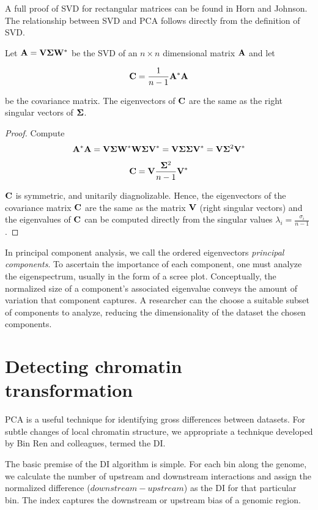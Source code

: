 A full proof of \gls{SVD} for rectangular matrices can be found in Horn and Johnson\cite{horn2013}. The relationship between
\gls{SVD} and \gls{PCA} follows directly from the definition of \gls{SVD}.

\begin{thm}
  Let $\mathbf{A} = \mathbf{V}\mathbf{\Sigma}\mathbf{W}^*$ be the \gls{SVD} of an $n \times n$ dimensional matrix $\mathbf{A}$ and let

  \[
    \mathbf{C} = \frac{1}{n - 1}\mathbf{A}^*\mathbf{A}
  \]

  be the covariance matrix.  The eigenvectors of $\mathbf{C}$ are the same as the \textnormal{right singular vectors} of
  $\mathbf{\Sigma}$.
\end{thm}

\begin{proof}
  Compute
  \[
    \mathbf{A}^*\mathbf{A} =
    \mathbf{V\Sigma}\mathbf{W}^*\mathbf{W\Sigma}\mathbf{V}^* =
    \mathbf{V\Sigma\Sigma}\mathbf{V}^* =
    \mathbf{V}\mathbf{\Sigma}^2\mathbf{V}^*
  \]

  \[
    \mathbf{C} = \mathbf{V}\frac{\mathbf{\Sigma}^2}{n - 1}\mathbf{V}^*
  \]

  $\mathbf{C}$ is symmetric, and unitarily diagnolizable.  Hence, the eigenvectors of the covariance matrix $\mathbf{C}$ are the same as the
  matrix $\mathbf{V}$ (right singular vectors) and the eigenvalues of $\mathbf{C}$ can be computed directly from the singular values
  $\lambda_i = \frac{\sigma_i}{n - 1}$.
\end{proof}

In principal component analysis, we call the ordered eigenvectors \textit{principal components}.  To ascertain the importance of each
component, one must analyze the \gls{eigenspectrum}, usually in the form of a \gls{scree plot}.  Conceptually, the normalized size of a component's
associated eigenvalue conveys the amount of variation that component captures.  A researcher can the choose a suitable subset of components to
analyze, reducing the dimensionality of the dataset the chosen components.

\section*{Detecting chromatin transformation}

\gls{PCA} is a useful technique for identifying gross differences between datasets.  For subtle changes of local chromatin structure, we appropriate a 
technique developed by Bin Ren and colleagues\cite{ren2013}, termed the \gls{DI}.

The basic premise of the \gls{DI} algorithm is simple.  For each bin along the genome, we calculate the number of upstream and downstream interactions and
assign the normalized difference ($downstream - upstream$) as the \gls{DI} for that particular bin.  The index captures the downstream or upstream bias of
a genomic region.  
